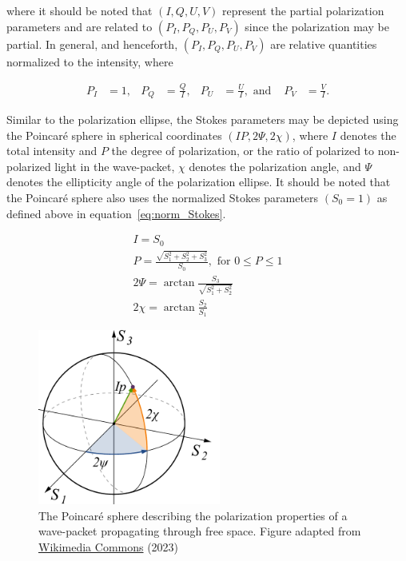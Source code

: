 \noindent where it should be noted that $(I, Q, U, V)$ represent the partial polarization parameters and are related to $(P_{I}, P_{Q}, P_{U}, P_{V})$ since the polarization may be partial. In general, and henceforth, $(P_{I}, P_{Q}, P_{U}, P_{V})$ are relative quantities normalized to the intensity, where

\begin{align}
  P_{I} & = 1, & P_{Q} & = \frac{Q}{I}, & P_{U} & = \frac{U}{I}, \text{   and } & P_{V} & = \frac{V}{I}.
  \label{eq:norm_Stokes}
\end{align}

Similar to the polarization ellipse, the Stokes parameters may be depicted using the Poincar{\'e} sphere in spherical coordinates $(IP, 2 \Psi, 2 \chi)$, where $I$ denotes the total intensity and $P$ the degree of polarization, or the ratio of polarized to non-polarized light in the wave-packet, $\chi$ denotes the polarization angle, and $\Psi$ denotes the ellipticity angle of the polarization ellipse. It should be noted that the Poincar{\'e} sphere also uses the normalized Stokes parameters $(S_{0} = 1)$ as defined above in equation~\ref{eq:norm_Stokes}.

\begin{equation}
  \begin{gathered}
    I = S_{0} \\
    P = \frac{\sqrt{S_{1}^2 + S_{2}^2 + S_{3}^2}}{S_{0}}, \text{ for } 0 \leq P \leq 1 \\
    2 \Psi = \arctan \frac{S_{3}}{\sqrt{S_{1}^{2} + S_{2}^{2}}} \\
    2 \chi = \arctan \frac{S_{2}}{S_{1}}
  \end{gathered}
  \label{eq:poincare_coords}
\end{equation}

\begin{figure}[t]
  \centering
  \includegraphics[width=6cm]{figures/2_poincare_sphere.pdf}
  \caption{The Poincar{\'e} sphere describing the polarization properties of a wave-packet propagating through free space. Figure adapted from \protect\href{https://commons.wikimedia.org/wiki/File:Poincaré_sphere.svg}{Wikimedia Commons} (2023)}
  \label{fig:poincare}
\end{figure}
\prgph


